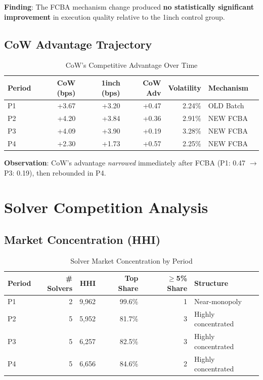\documentclass[11pt,a4paper]{article}
\begin{document}
\textbf{Finding}: The FCBA mechanism change produced \textbf{no statistically significant improvement} in execution quality relative to the 1inch control group.

\subsection{CoW Advantage Trajectory}

\begin{table}[H]
\centering
\caption{CoW's Competitive Advantage Over Time}
\begin{tabular}{lrrrrll}
\toprule
\textbf{Period} & \textbf{CoW (bps)} & \textbf{1inch (bps)} & \textbf{CoW Adv} & \textbf{Volatility} & \textbf{Mechanism} \\
\midrule
P1 & +3.67 & +3.20 & +0.47 & 2.24\% & OLD Batch \\
P2 & +4.20 & +3.84 & +0.36 & 2.91\% & NEW FCBA \\
P3 & +4.09 & +3.90 & +0.19 & 3.28\% & NEW FCBA \\
P4 & +2.30 & +1.73 & +0.57 & 2.25\% & NEW FCBA \\
\bottomrule
\end{tabular}
\end{table}

\textbf{Observation}: CoW's advantage \textit{narrowed} immediately after FCBA (P1: 0.47 $\rightarrow$ P3: 0.19), then rebounded in P4.

\section{Solver Competition Analysis}

\subsection{Market Concentration (HHI)}

\begin{table}[H]
\centering
\caption{Solver Market Concentration by Period}
\begin{tabular}{lrrrrl}
\toprule
\textbf{Period} & \textbf{\# Solvers} & \textbf{HHI} & \textbf{Top Share} & \textbf{$\geq$5\% Share} & \textbf{Structure} \\
\midrule
P1 & 2 & 9,962 & 99.6\% & 1 & Near-monopoly \\
P2 & 5 & 5,952 & 81.7\% & 3 & Highly concentrated \\
P3 & 5 & 6,257 & 82.5\% & 3 & Highly concentrated \\
P4 & 5 & 6,656 & 84.6\% & 2 & Highly concentrated \\
\bottomrule
\end{tabular}
\end{table}
\end{document}
